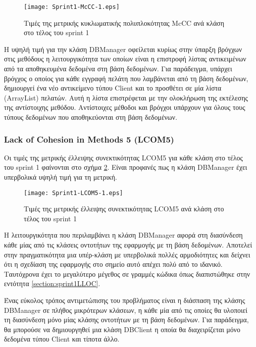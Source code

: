 \begin{figure}
\centering
\texttt{[image: Sprint1-McCC-1.eps]}
\caption{Τιμές της μετρικής κυκλωματικής πολυπλοκότητας McCC ανά κλάση στο τέλος του sprint 1}
\label{fig:sprint1McCC}
\end{figure}

H υψηλή τιμή για την κλάση DBManager οφείλεται κυρίως στην
ύπαρξη βρόγχων στις μεθόδους η λειτουργικότητα των οποίων είναι η
επιστροφή λίστας αντικειμένων από τα αποθηκευμένα δεδομένα στη βάση
δεδομένων. Για παράδειγμα, υπάρχει βρόγχος ο οποίος για κάθε εγγραφή
πελάτη που λαμβάνεται από τη βάση δεδομένων, δημιουργεί ένα νέο
αντικείμενο τύπου Client και το προσθέτει σε μία λίστα (ArrayList)
πελατών. Αυτή η λίστα επιστρέφεται με την ολοκλήρωση της εκτέλεσης της
αντίστοιχης μεθόδου. Αντίστοιχες μέθοδοι και βρόγχοι υπάρχουν για όλους
τους τύπους δεδομένων που αποθηκεύονται στη βάση δεδομένων.

\subsubsection{Lack of Cohesion in Methods 5 (LCOM5)}
\label{section:sprint1LCOM5}

Οι τιμές της μετρικής έλλειψης συνεκτικότητας LCOM5 για κάθε κλάση στο
τέλος του sprint 1 φαίνονται στο σχήμα \ref{fig:sprint1LCOM5}. Είναι
προφανές πως η κλάση DBManager έχει υπερβολικά υψηλή τιμή για τη
μετρική.

\begin{figure}
\centering
\texttt{[image: Sprint1-LCOM5-1.eps]}
\caption{Τιμές της μετρικής έλλειψης συνεκτικότητας LCOM5 ανά κλάση στο τέλος του sprint 1}
\label{fig:sprint1LCOM5}
\end{figure}

Η λειτουργικότητα που περιλαμβάνει η κλάση DBManager αφορά στη
διασύνδεση κάθε μίας από τις κλάσεις οντοτήτων της εφαρμογής με τη βάση
δεδομένων. Αποτελεί στην πραγματικότητα μια υπέρ-κλάση με υπερβολικά
πολλές αρμοδιότητες και δείχνει ότι η σχεδίαση της εφαρμογής στο σημείο
αυτό απέχει πολύ από το ιδανικό. Ταυτόχρονα έχει το μεγαλύτερο μέγεθος
σε γραμμές κώδικα όπως διαπιστώθηκε στην εντότητα
\ref{section:sprint1LLOC}.

Ένας εύκολος τρόπος αντιμετώπισης του προβλήματος είναι η διάσπαση της
κλάσης DBManager σε πλήθος μικρότερων κλάσεων, η κάθε μία από τις οποίες
θα υλοποιεί τη διασύνδεση μόνο μίας κλάσης οντοτήτων με τη βάση
δεδομένων. Για παράδειγμα, θα μπορούσε να δημιουργηθεί μια κλάση
DBClient η οποία θα διαχειρίζεται μόνο δεδομένα τύπου Client και τίποτα
άλλο.

